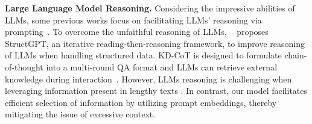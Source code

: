

\noindent
\textbf{Large Language Model Reasoning.}
Considering the impressive abilities of LLMs, some previous works focus on facilitating LLMs' reasoning via prompting~\cite{NSM,CBR-KBQA,structgpt,wang2023knowledge,li2024visualization,10.1007/978-981-97-7232-2_18,chen2024tackling}.
To overcome the unfaithful reasoning of LLMs, ~\citet{structgpt} proposes StructGPT, an iterative reading-then-reasoning framework, to improve reasoning of LLMs when handling structured data.
KD-CoT is designed to formulate chain-of-thought into a multi-round QA format and LLMs can retrieve external knowledge during interaction~\cite{wang2023knowledge}.
However, LLMs reasoning is challenging when leveraging information present in lengthy texts \cite{wang2024beyond}. In contrast, our model facilitates efficient selection of information by utilizing prompt embeddings, thereby mitigating the issue of excessive context.

